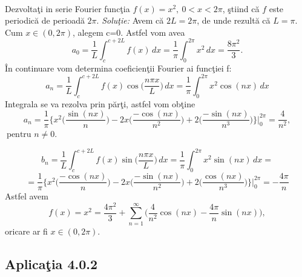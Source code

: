 \documentclass[a4paper,openany,12pt]{report}
\begin{document}
\paragraph*{}Dezvolta\c ti in serie Fourier func\c tia $f(x)=x^2, \: 0< x< 2\pi$, \c stiind c\u a $f$ este periodic\u a de perioad\u a $2\pi$.
\newline
\newline
\textit{Solu\c tie:}
\newline
Avem c\u a $2L=2\pi$, de unde rezult\u a c\u a $L=\pi$.\\
Cum $x \in (0, 2\pi)$, alegem c=0. Astfel vom avea
\begin{equation*}
a_0=\frac{1}{L}\int_{c}^{c+2L} f(x)\, dx = \frac{1}{\pi}\int_{0}^{2\pi} x^2\, dx = \frac{8\pi^2}{3}.
\end{equation*}
\^ In continuare vom determina coeficien\c tii Fourier ai func\c tiei f:
\begin{equation*}
a_n=\frac{1}{L}\int_{c}^{c+2L} f(x) \cos\Big(\frac{n\pi x}{L}\Big)\, dx =\frac{1}{\pi}\int_{0}^{2\pi} x^2 \cos(nx)\, dx
\end{equation*}
Integrala se va rezolva prin p\u ar\c ti, astfel vom ob\c tine
\begin{equation*}
a_n= \frac{1}{\pi}\bigg\{x^2\bigg(\frac{\sin(nx)}{n}\bigg)-2x\bigg(\frac{-\cos(nx)}{n^2}\bigg)+2\bigg(\frac{-\sin(nx)}{n^3}\bigg)\bigg\} \bigg|_{0}^{2\pi} = \frac{4}{n^2},
\end{equation*}
$\: \text{pentru } n \neq 0. $

\begin{equation*}
b_n = \frac{1}{L}\int_{c}^{c+2L} f(x) \sin\Big(\frac{n\pi x}{L}\Big)\, dx = \frac{1}{\pi}\int_{0}^{2\pi} x^2 \sin(nx)\, dx = 
\end{equation*}
\begin{equation*}
=\frac{1}{\pi}\bigg\{x^2\bigg(\frac{-\cos(nx)}{n}\bigg)-2x\bigg(\frac{-\sin(nx)}{n^2}\bigg)+2\bigg(\frac{\cos(nx)}{n^3}\bigg)\bigg\} \bigg|_{0}^{2\pi} = -\frac{4\pi}{n}
\end{equation*}
\newline
Astfel avem 
\begin{equation*}
f(x) = x^2 = \frac{4\pi^2}{3} + \sum_{n=1}^\infty\bigg( \frac{4}{n^2}\cos(nx)-\frac{4\pi}{n}\sin(nx)\bigg),
\end{equation*}
oricare ar fi $x \in (0, 2\pi)$.





\subsection*{Aplica\c tia 4.0.2}
\end{document}
